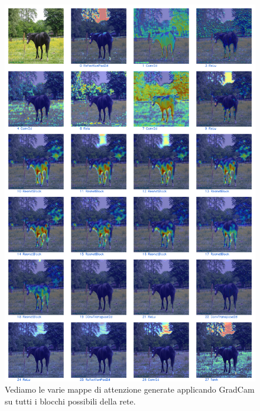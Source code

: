 \begin{figure}[H]
  \begin{center}
    \includegraphics[width=0.8\columnwidth]{images/gradCam horse.png}
  \end{center}
  \caption{Vediamo le varie mappe di attenzione generate applicando GradCam su tutti i blocchi possibili della rete.}
  \label{fig:GradCam Horse}
\end{figure}

